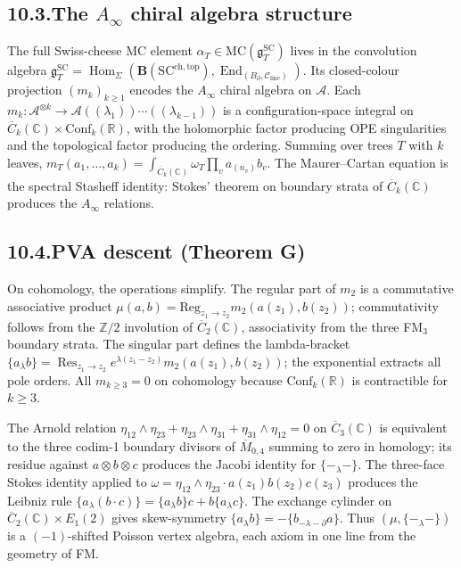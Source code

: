 \documentclass[11pt]{report}
\theoremstyle{definition}
\theoremstyle{remark}
\providecommand{\cA}{\mathcal{A}}
\providecommand{\cC}{\mathcal{C}}
\providecommand{\MC}{\mathrm{MC}}
\providecommand{\FM}{\overline{C}}
\providecommand{\fg}{\mathfrak{g}}
\providecommand{\SC}{\mathrm{SC}}
\providecommand{\Reg}{\mathrm{Reg}}
\providecommand{\SCchtop}{\mathrm{SC}^{\mathrm{ch,top}}}
\providecommand{\bC}{\mathbb{C}}
\providecommand{\bR}{\mathbb{R}}
\providecommand{\bZ}{\mathbb{Z}}
\providecommand{\Conf}{\mathrm{Conf}}
\providecommand{\Res}{\operatorname{Res}}
\DeclareMathOperator{\End}{End}
\DeclareMathOperator{\Hom}{Hom}
\numberwithin{equation}{section}
\begin{document}
\subsection*{10.3.\enspace The $A_\infty$ chiral algebra structure}

The full Swiss-cheese MC element $\alpha_T \in \MC(\fg^{\SC}_T)$
lives in the convolution algebra
$\fg^{\SC}_T = \Hom_\Sigma(\mathbf B(\SCchtop),
\End_{(B_\partial, \cC_{\mathrm{line}})})$. Its closed-colour
projection $(m_k)_{k \ge 1}$ encodes the $A_\infty$ chiral
algebra on $\cA$. Each $m_k\colon \cA^{\otimes k} \to
\cA(\!(\lambda_1)\!)\cdots(\!(\lambda_{k-1})\!)$ is a
configuration-space integral on
$\FM_k(\bC) \times \Conf_k(\bR)$, with the holomorphic factor
producing OPE singularities and the topological factor
producing the ordering. Summing over trees $T$ with $k$ leaves,
$m_T(a_1,\ldots,a_k) = \int_{\FM_k(\bC)}\omega_T \prod_{v}
a_{(n_v)} b_v$. The Maurer--Cartan equation is the spectral
Stasheff identity: Stokes' theorem on boundary strata of
$\FM_k(\bC)$ produces the $A_\infty$ relations.

\subsection*{10.4.\enspace PVA descent (Theorem G)}

On cohomology, the operations simplify. The regular part of
$m_2$ is a commutative associative product
$\mu(a,b) = \Reg_{z_1 \to z_2} m_2(a(z_1), b(z_2))$;
commutativity follows from the $\bZ/2$ involution of
$\FM_2(\bC)$, associativity from the three FM$_3$ boundary
strata. The singular part defines the lambda-bracket
$\{a_\lambda b\} = \Res_{z_1 \to z_2} e^{\lambda(z_1 - z_2)}
m_2(a(z_1), b(z_2))$; the exponential extracts all pole orders.
All $m_{k \ge 3} = 0$ on cohomology because $\Conf_k(\bR)$ is
contractible for $k \ge 3$.

The Arnold relation
$\eta_{12}\wedge\eta_{23} + \eta_{23}\wedge\eta_{31}
+ \eta_{31}\wedge\eta_{12} = 0$ on $\FM_3(\bC)$ is equivalent
to the three codim-1 boundary divisors of $\overline M_{0,4}$
summing to zero in homology; its residue against
$a\otimes b\otimes c$ produces the Jacobi identity for
$\{-_\lambda -\}$. The three-face Stokes identity applied to
$\omega = \eta_{12}\wedge\eta_{23}\cdot a(z_1)b(z_2)c(z_3)$
produces the Leibniz rule $\{a_\lambda(b\cdot c)\} =
\{a_\lambda b\}c + b\{a_\lambda c\}$. The exchange cylinder
on $\FM_2(\bC)\times E_1(2)$ gives skew-symmetry
$\{a_\lambda b\} = -\{b_{-\lambda - \partial} a\}$. Thus
$(\mu, \{-_\lambda -\})$ is a $(-1)$-shifted Poisson vertex
algebra, each axiom in one line from the geometry of FM.
\end{document}
